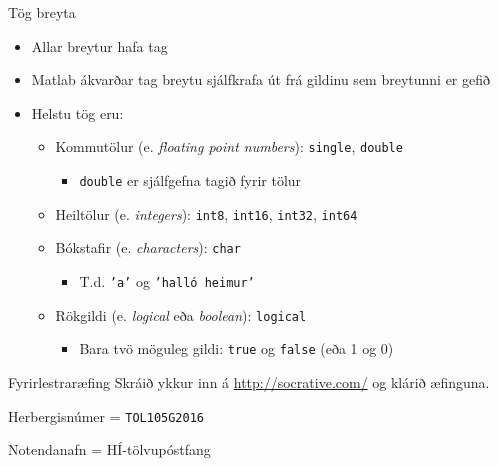 \documentclass[handout]{beamer}
\begin{document}
\begin{frame}{Tög breyta}
\begin{itemize}
 \item Allar breytur hafa tag
 \item Matlab ákvarðar tag breytu sjálfkrafa út frá gildinu sem breytunni er gefið
 \item Helstu tög eru:
 \begin{itemize}
  \item Kommutölur (e. \emph{floating point numbers}):  \texttt{single}, \texttt{double}
  \begin{itemize}
   \item \texttt{double} er sjálfgefna tagið fyrir tölur
  \end{itemize}
  \item Heiltölur (e. \emph{integers}): \texttt{int8}, \texttt{int16}, \texttt{int32}, \texttt{int64}
  \item Bókstafir (e. \emph{characters}): \texttt{char}
  \begin{itemize}
   \item T.d. \texttt{'a'} og \texttt{'halló heimur'}
  \end{itemize}
  \item Rökgildi (e. \emph{logical} eða \emph{boolean}): \texttt{logical}
  \begin{itemize}
   \item Bara tvö möguleg gildi: \texttt{true} og \texttt{false} (eða 1 og 0)
  \end{itemize}
 \end{itemize}
\end{itemize}
\end{frame}

\begin{frame}{Fyrirlestraræfing}
Skráið ykkur inn á \url{http://socrative.com/} og klárið æfinguna.

Herbergisnúmer = \texttt{TOL105G2016}

Notendanafn = HÍ-tölvupóstfang
\end{frame}
\end{document}
